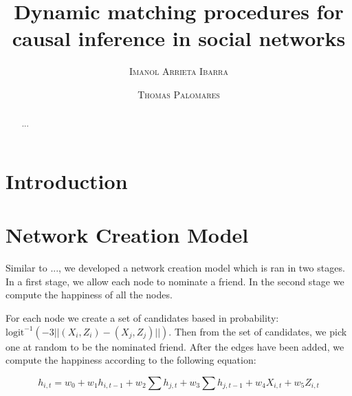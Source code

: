 \documentclass[11pt]{article}
\title{Dynamic matching procedures for causal inference in social networks}
\author{{\textsc{Imanol Arrieta Ibarra}} \\
 \and {\textsc{Thomas Palomares}} \\
}
\begin{document}
\maketitle


\begin{abstract}
...
\end{abstract}

\newpage

\section{Introduction}

\section{Network Creation Model}

Similar to ..., we developed a network creation model which is ran in two stages. In a first stage, we allow each node to nominate a friend. In the second stage we compute the happiness of all the nodes.

For each node we create a set of candidates based in probability: $\text{logit}^{-1} \left(-3||(X_i,Z_i)-(X_j,Z_j)||\right)$. Then from the set of candidates, we pick one at random to be the nominated friend. After the edges have been added, we compute the happiness according to the following equation:

$$h_{i,t} = w_0 +w_1 h_{i,t-1} + w_2\sum\limits h_{j,t} + w_3\sum\limits h_{j,t-1} + w_4 X_{i,t} + w_5 Z_{i,t}$$




\end{document}
